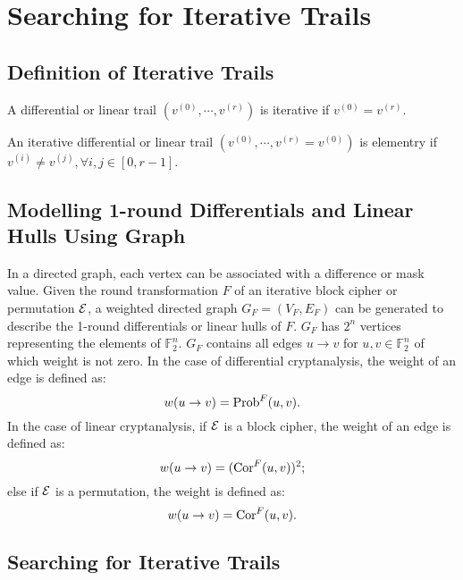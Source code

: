 \section{Searching for Iterative Trails\label{sec:method}}

\subsection{Definition of Iterative Trails}

\begin{definition}
	A differential or linear trail $(v^{(0)},\cdots,v^{(r)})$ is iterative if $v^{(0)}=v^{(r)}$.
\end{definition}

\begin{definition}
    An iterative differential or linear trail $(v^{(0)},\cdots,v^{(r)}=v^{(0)})$ is elementry if $v^{(i)}\neq v^{(j)},\forall i,j\in [0,r-1]$.
\end{definition}

\subsection{Modelling 1-round Differentials and Linear Hulls Using Graph}

In a directed graph, each vertex can be associated with a difference or mask value. Given the round transformation $F$ of an iterative block cipher or permutation $\mathcal{E}$, a weighted directed graph $G_{F}=(V_{F},E_{F})$ can be generated to describe the 1-round differentials or linear hulls of $F$. $G_{F}$ has $2^n$ vertices representing the elements of $\mathbb{F}_2^n$. $G_{F}$ contains all edges $u\rightarrow v$ for $u,v\in \mathbb{F}_2^n$ of which weight is not zero. In the case of differential cryptanalysis, the weight of an edge is defined as:
\[
    w(u\rightarrow v)=\text{Prob}^{F}(u,v).
\]
In the case of linear cryptanalysis, if $\mathcal{E}$ is a block cipher, the weight of an edge is defined as:
\[
    w(u\rightarrow v)=(\text{Cor}^{F}(u,v))^2;
\]
else if $\mathcal{E}$ is a permutation, the weight is defined as:
\[
    w(u\rightarrow v)=\text{Cor}^{F}(u,v).
\]

\subsection{Searching for Iterative Trails\label{subsec:iterative-trails}}

